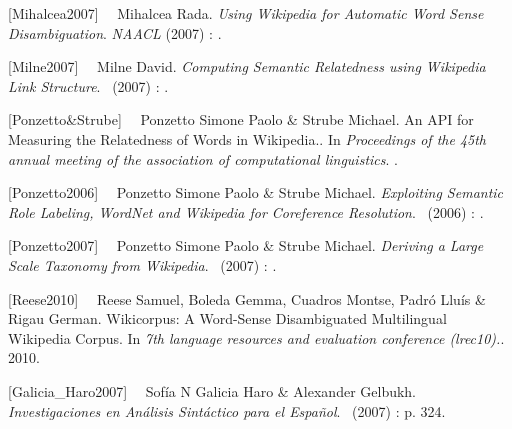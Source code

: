 \documentclass[letterpaper]{article}
\newcommand\textstylebibusindexbase[1]{#1}
\newcommand\textstylebibusindexbasei[1]{\textit{#1}}
\begin{document}
{
\textstylebibusindexbase{[Mihalcea2007]
}\ \ \textstylebibusindexbase{Mihalcea Rada.
}\textstylebibusindexbasei{Using Wikipedia for Automatic Word Sense
Disambiguation}\textstylebibusindexbase{.
}\textstylebibusindexbasei{NAACL}\textstylebibusindexbase{ (2007)
}\textstylebibusindexbase{: }\textstylebibusindexbase{.}}

{
\textstylebibusindexbase{[Milne2007] }\ \ \textstylebibusindexbase{Milne
David. }\textstylebibusindexbasei{Computing Semantic
Relatedness\newline
using Wikipedia Link Structure}\textstylebibusindexbase{.
}\textstylebibusindexbase{\ (}\textstylebibusindexbase{2007)
}\textstylebibusindexbase{: }\textstylebibusindexbase{.}}

{
\textstylebibusindexbase{[Ponzetto\&Strube]
}\ \ \textstylebibusindexbase{Ponzetto Simone Paolo \& Strube Michael.
An API for Measuring the Relatedness of Words in Wikipedia.. In
}\textstylebibusindexbasei{Proceedings of the 45th annual meeting of
the association of computational linguistics}\textstylebibusindexbase{.
}\textstylebibusindexbase{.}}

{
\textstylebibusindexbase{[Ponzetto2006]
}\ \ \textstylebibusindexbase{Ponzetto Simone Paolo \& Strube Michael.
}\textstylebibusindexbasei{Exploiting Semantic Role Labeling, WordNet
and Wikipedia for Coreference Resolution}\textstylebibusindexbase{.
}\textstylebibusindexbase{\ (}\textstylebibusindexbase{2006)
}\textstylebibusindexbase{: }\textstylebibusindexbase{.}}

{
\textstylebibusindexbase{[Ponzetto2007]
}\ \ \textstylebibusindexbase{Ponzetto Simone Paolo \& Strube Michael.
}\textstylebibusindexbasei{Deriving a Large Scale Taxonomy from
Wikipedia}\textstylebibusindexbase{.
}\textstylebibusindexbase{\ (}\textstylebibusindexbase{2007)
}\textstylebibusindexbase{: }\textstylebibusindexbase{.}}

{
\textstylebibusindexbase{[Reese2010] }\ \ \textstylebibusindexbase{Reese
Samuel, Boleda Gemma, Cuadros Montse, Padr\'o Llu\'is \& Rigau German.
Wikicorpus: A Word-Sense Disambiguated Multilingual Wikipedia Corpus.
In }\textstylebibusindexbasei{7th language resources and evaluation
conference (lrec{\textquotesingle}10).}\textstylebibusindexbase{.
2010.}}

{
\textstylebibusindexbase{[Galicia\_Haro2007]
}\ \ \textstylebibusindexbase{Sof\'ia N Galicia Haro \& Alexander
Gelbukh. }\textstylebibusindexbasei{Investigaciones en An\'alisis
Sint\'actico para el Espa\~nol}\textstylebibusindexbase{.
}\textstylebibusindexbase{\ (}\textstylebibusindexbase{2007)
}\textstylebibusindexbase{: }\textstylebibusindexbase{p. 324.}}
\end{document}
